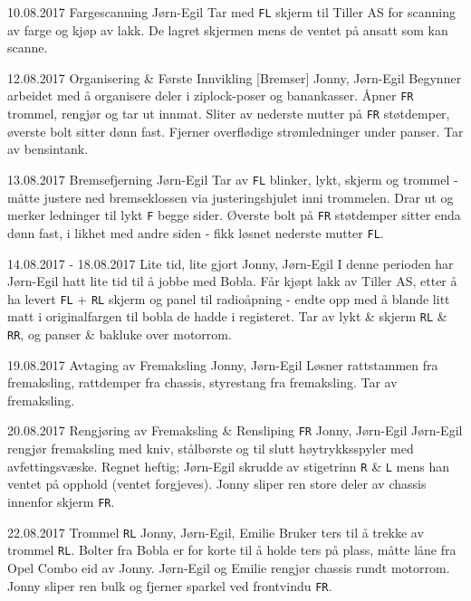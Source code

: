 \worklogitem
	{10.08.2017}
	{Fargescanning}
	{J\o rn-Egil}
	{Tar med \texttt{FL} skjerm til Tiller AS for scanning av farge og kjøp av lakk. De lagret skjermen mens de ventet på ansatt som kan scanne.}

\worklogitem
	{12.08.2017}
	{Organisering \& F\o rste Innvikling [Bremser]}
	{Jonny, J\o rn-Egil}
	{Begynner arbeidet med å organisere deler i ziplock-poser og banankasser. Åpner \texttt{FR} trommel, rengjør og tar ut innmat. Sliter av nederste mutter på \texttt{FR} støtdemper, øverste bolt sitter dønn fast. Fjerner overflødige strømledninger under panser. Tar av bensintank.}

\worklogitem
	{13.08.2017}
	{Bremsefjerning}
	{J\o rn-Egil}
	{Tar av \texttt{FL} blinker, lykt, skjerm og trommel - måtte justere ned bremseklossen via justeringshjulet inni trommelen. Drar ut og merker ledninger til lykt \texttt{F} begge sider. Øverste bolt på \texttt{FR} støtdemper sitter enda dønn fast, i likhet med andre siden - fikk løsnet nederste mutter \texttt{FL}.}

\worklogitem
	{14.08.2017 - 18.08.2017}
	{Lite tid, lite gjort}
	{Jonny, J\o rn-Egil}
	{I denne perioden har Jørn-Egil hatt lite tid til å jobbe med Bobla. Får kjøpt lakk av Tiller AS, etter å ha levert \texttt{FL} + \texttt{RL} skjerm og panel til radioåpning - endte opp med å blande litt matt i originalfargen til bobla de hadde i registeret. Tar av lykt \& skjerm \texttt{RL} \& \texttt{RR}, og panser \& bakluke over motorrom.}

\worklogitem
	{19.08.2017}
	{Avtaging av Fremaksling}
	{Jonny, Jørn-Egil}
	{Løsner rattstammen fra fremaksling, rattdemper fra chassis, styrestang fra fremaksling. Tar av fremaksling.}

\worklogitem
	{20.08.2017}
	{Rengjøring av Fremaksling \& Rensliping \texttt{FR}}
	{Jonny, Jørn-Egil}
	{Jørn-Egil rengjør fremaksling med kniv, stålbørste og til slutt høytrykksspyler med avfettingsvæske. Regnet heftig; Jørn-Egil skrudde av stigetrinn \texttt{R} \& \texttt{L} mens han ventet på opphold (ventet forgjeves). Jonny sliper ren store deler av chassis innenfor skjerm \texttt{FR}.}

\worklogitem
	{22.08.2017}
	{Trommel \texttt{RL}}
	{Jonny, Jørn-Egil, Emilie}
	{Bruker ters til å trekke av trommel \texttt{RL}. Bolter fra Bobla er for korte til å holde ters på plass, måtte låne fra Opel Combo eid av Jonny. Jørn-Egil og Emilie rengjør chassis rundt motorrom. Jonny sliper ren bulk og fjerner sparkel ved frontvindu \texttt{FR}.}

